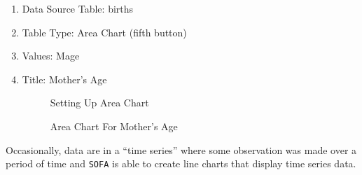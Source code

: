 \begin{enumerate}
  \item Data Source Table: births
  \item Table Type: Area Chart (fifth button)
  \item Values: Mage
  \item Title: Mother's Age
  
  \begin{figure}[H]
    \begin{center}
      \caption{Setting Up Area Chart}
    \end{center}
  \end{figure}
  
  \begin{figure}[H]
    \begin{center}
      \caption{Area Chart For Mother's Age}
    \end{center}
  \end{figure}
\end{enumerate}

Occasionally, data are in a ``time series'' where some observation was made over a period of time and \texttt{SOFA} is able to create line charts that display time series data.

